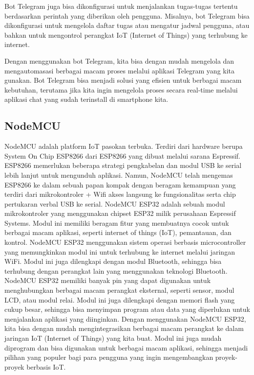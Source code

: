 \documentclass[conference]{IEEEtran}
\begin{document}
Bot Telegram juga bisa dikonfigurasi untuk menjalankan tugas-tugas tertentu berdasarkan perintah yang diberikan oleh pengguna. Misalnya, bot Telegram bisa dikonfigurasi untuk mengelola daftar tugas atau mengatur jadwal pengguna, atau bahkan untuk mengontrol perangkat IoT (Internet of Things) yang terhubung ke internet.

Dengan menggunakan bot Telegram, kita bisa dengan mudah mengelola dan mengautomasasi berbagai macam proses melalui aplikasi Telegram yang kita gunakan. Bot Telegram bisa menjadi solusi yang efisien untuk berbagai macam kebutuhan, terutama jika kita ingin mengelola proses secara real-time melalui aplikasi chat yang sudah terinstall di smartphone kita.

\subsection{NodeMCU}
\vspace{0.2cm}
NodeMCU adalah platform IoT pasokan terbuka. Terdiri dari hardware berupa System On Chip ESP8266 dari ESP8266 yang dibuat melalui sarana Espressif. ESP8266 memerlukan beberapa strategi pengkabelan dan modul USB ke serial lebih lanjut untuk mengunduh aplikasi. Namun, NodeMCU telah mengemas ESP8266 ke dalam sebuah papan kompak dengan beragam kemampuan yang terdiri dari mikrokontroler + Wifi akses langsung ke fungsionalitas serta chip pertukaran verbal USB ke serial. NodeMCU ESP32 adalah sebuah modul mikrokontroler yang menggunakan chipset ESP32 milik perusahaan Espressif Systems. Modul ini memiliki beragam fitur yang membuatnya cocok untuk berbagai macam aplikasi, seperti internet of things (IoT), pemantauan, dan kontrol.
NodeMCU ESP32 menggunakan sistem operasi berbasis microcontroller yang memungkinkan modul ini untuk terhubung ke internet melalui jaringan WiFi. Modul ini juga dilengkapi dengan modul Bluetooth, sehingga bisa terhubung dengan perangkat lain yang menggunakan teknologi Bluetooth.
NodeMCU ESP32 memiliki banyak pin yang dapat digunakan untuk menghubungkan berbagai macam perangkat eksternal, seperti sensor, modul LCD, atau modul relai. Modul ini juga dilengkapi dengan memori flash yang cukup besar, sehingga bisa menyimpan program atau data yang diperlukan untuk menjalankan aplikasi yang diinginkan.
Dengan menggunakan NodeMCU ESP32, kita bisa dengan mudah mengintegrasikan berbagai macam perangkat ke dalam jaringan IoT (Internet of Things) yang kita buat. Modul ini juga mudah diprogram dan bisa digunakan untuk berbagai macam aplikasi, sehingga menjadi pilihan yang populer bagi para pengguna yang ingin mengembangkan proyek-proyek berbasis IoT.
\end{document}
